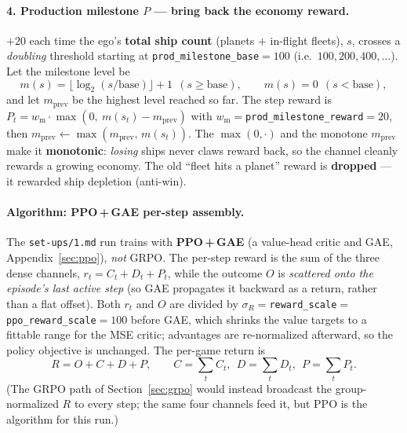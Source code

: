 \documentclass[11pt]{article}
\begin{document}
\paragraph{4. Production milestone $P$ --- bring back the economy reward.} $+20$ each time the ego's
\textbf{total ship count} (planets $+$ in-flight fleets), $s$, crosses a \emph{doubling} threshold
starting at \texttt{prod\_milestone\_base}$=100$ (i.e.\ $100,200,400,\dots$). Let the milestone level be
\begin{equation}
m(s) = \big\lfloor \log_2(s/\mathrm{base})\big\rfloor + 1 \ \ (s\ge\mathrm{base}),\qquad m(s)=0\ \ (s<\mathrm{base}),
\end{equation}
and let $m_{\mathrm{prev}}$ be the highest level reached so far. The step reward is
$P_t = w_{\mathrm m}\cdot\max(0,\ m(s_t)-m_{\mathrm{prev}})$ with $w_{\mathrm m}=$\texttt{prod\_milestone\_reward}$=20$,
then $m_{\mathrm{prev}}\leftarrow\max(m_{\mathrm{prev}},\,m(s_t))$. The $\max(0,\cdot)$ and the monotone
$m_{\mathrm{prev}}$ make it \textbf{monotonic}: \emph{losing} ships never claws reward back, so the
channel cleanly rewards a growing economy. The old ``fleet hits a planet'' reward is \textbf{dropped}
--- it rewarded ship depletion (anti-win).

\paragraph{Algorithm: PPO\,+\,GAE per-step assembly.} The \texttt{set-ups/1.md} run trains with
\textbf{PPO\,+\,GAE} (a value-head critic and GAE, Appendix~\ref{sec:ppo}), \emph{not} GRPO. The
per-step reward is the sum of the three dense channels, $r_t = C_t + D_t + P_t$, while the outcome $O$
is \emph{scattered onto the episode's last active step} (so GAE propagates it backward as a return,
rather than a flat offset). Both $r_t$ and $O$ are divided by
$\sigma_R=$\texttt{reward\_scale}$=$\texttt{ppo\_reward\_scale}$=100$ before GAE, which shrinks the value
targets to a fittable range for the MSE critic; advantages are re-normalized afterward, so the policy
objective is unchanged. The per-game return is
\begin{equation}
R = O + C + D + P,\qquad C=\textstyle\sum_t C_t,\ \ D=\textstyle\sum_t D_t,\ \ P=\textstyle\sum_t P_t.
\end{equation}
(The GRPO path of Section~\ref{sec:grpo} would instead broadcast the group-normalized $R$ to every step;
the same four channels feed it, but PPO is the algorithm for this run.)
\end{document}
